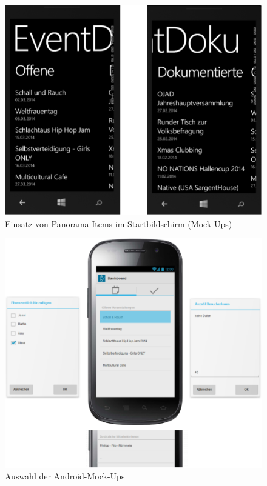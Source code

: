 \documentclass[Bachelorarbeit.tex]{subfiles}
\begin{document}
\begin{figure}
\centering
\includegraphics[width=0.8\linewidth]{./img/wp-startbildschirm}
\caption[Startbildschirm - Windows Phone (Mock-Ups)]{Einsatz von Panorama Items im Startbildschirm (Mock-Ups)}
\label{fig:wp-startbildschirm}
\end{figure}


\begin{figure}
\centering
\includegraphics[height=0.7\textheight, angle=90]{./img/Auswahl_Android_Mockups}
\caption{Auswahl der Android-Mock-Ups}
\label{fig:Auswahl_Android_Mockups}
\end{figure}
\end{document}

